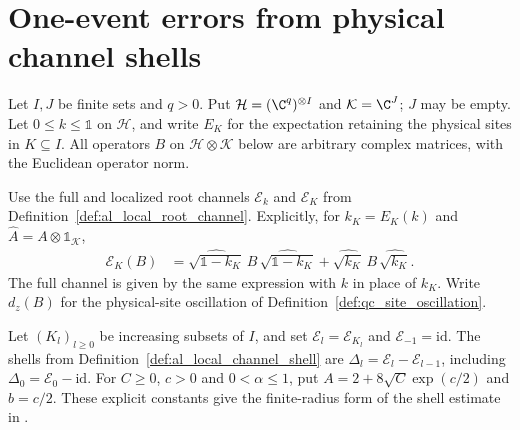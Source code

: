 
\section{One-event errors from physical channel shells}
\label{sec:al_channel_event_error}

Let $I,J$ be finite sets and $q>0$. Put
$\mathcal H=(\C^q)^{\otimes I}$ and $\mathcal K=\C^J$;
$J$ may be empty. Let $0\le k\le\mathbb 1$ on $\mathcal H$,
and write $E_K$ for the expectation retaining the physical sites
in $K\subseteq I$. All operators $B$ on
$\mathcal H\otimes\mathcal K$ below are arbitrary complex matrices,
with the Euclidean operator norm.

Use the full and localized root channels
$\mathcal E_k$ and $\mathcal E_K$ from
Definition~\ref{def:al_local_root_channel}. Explicitly, for
$k_K=E_K(k)$ and $\widehat A=A\otimes\mathbb 1_{\mathcal K}$,
\begin{align}
    \mathcal E_K(B)
     &=\widehat{\sqrt{\mathbb 1-k_K}}\,B\,
         \widehat{\sqrt{\mathbb 1-k_K}}
       +\widehat{\sqrt{k_K}}\,B\,\widehat{\sqrt{k_K}}.
    \label{eq:al_event_local_channel}
\end{align}
The full channel is given by the same expression with $k$ in
place of $k_K$. Write $d_z(B)$ for the physical-site oscillation
of Definition~\ref{def:qc_site_oscillation}.

Let $(K_l)_{l\ge0}$ be increasing subsets of $I$, and set
$\mathcal E_l=\mathcal E_{K_l}$ and $\mathcal E_{-1}=\mathrm{id}$.
The shells from Definition~\ref{def:al_local_channel_shell} are
$\Delta_l=\mathcal E_l-\mathcal E_{l-1}$, including
$\Delta_0=\mathcal E_0-\mathrm{id}$.
For $C\ge0$, $c>0$ and $0<\alpha\le1$, put
$A=2+8\sqrt C\exp(c/2)$ and $b=c/2$.
These explicit constants give the finite-radius form of the
shell estimate in \cite[\texttt{09-amplification.tex},
lines 101--121]{OpenAI2026AreaLaw}.

